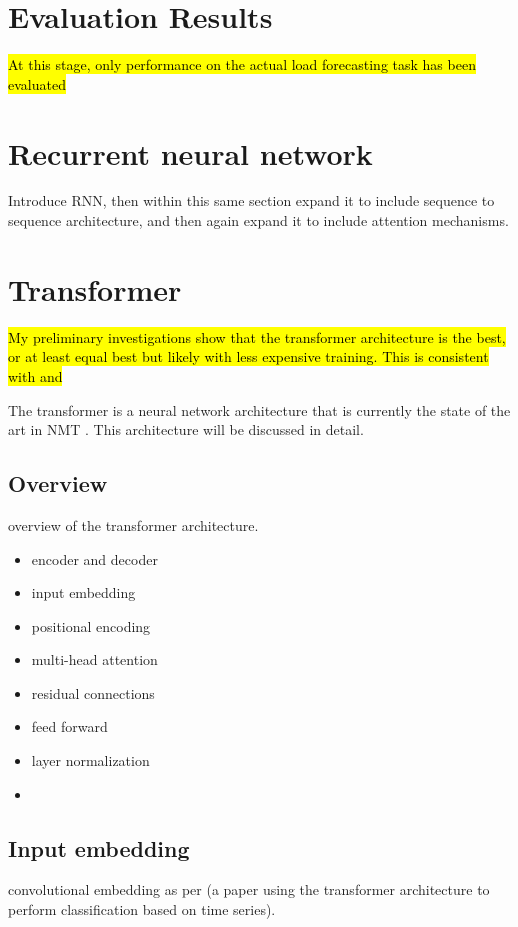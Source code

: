 \section{Evaluation Results}
\hl{At this stage, only performance on the actual load forecasting task has been evaluated}

\section{Recurrent neural network}
Introduce RNN, then within this same section expand it to include sequence to sequence architecture, and then again expand it to include attention mechanisms.

\section{Transformer}
\hl{My preliminary investigations show that the transformer architecture is the best, or at least equal best but likely with less expensive training. This is consistent with \protect\cite{Song2017} and \protect\cite{Vaswani2017}}\\
\par
The transformer is a neural network architecture that is currently the state of the art in NMT \citep{Vaswani2017}.
This architecture will be discussed in detail. 

\subsection{Overview}
overview of the transformer architecture.
\begin{itemize}
	\item encoder and decoder
	\item input embedding
	\item positional encoding
	\item multi-head attention
	\item residual connections
	\item feed forward
	\item layer normalization
	\item 
\end{itemize}

\subsection{Input embedding}
convolutional embedding as per \citep{Song2017} (a paper using the transformer architecture to perform classification based on time series).

